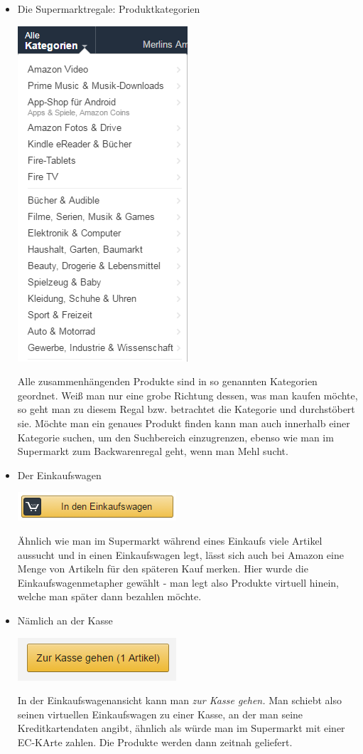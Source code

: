 \documentclass[a4paper,10pt]{article}
\begin{document}
\begin{itemize}
\item Die Supermarktregale: Produktkategorien

\includegraphics[scale=1]{kategorien.png}

Alle zusammenhängenden Produkte sind in so genannten Kategorien geordnet. Weiß man nur eine grobe Richtung dessen, was man kaufen möchte, so geht man zu diesem Regal bzw. betrachtet die Kategorie und durchstöbert sie. Möchte man ein genaues Produkt finden kann man auch innerhalb einer Kategorie suchen, um den Suchbereich einzugrenzen, ebenso wie man im Supermarkt zum Backwarenregal geht, wenn man Mehl sucht.

\item Der Einkaufswagen

\includegraphics[scale=1]{wagen.png}

Ähnlich wie man im Supermarkt während eines Einkaufs viele Artikel aussucht und in einen Einkaufswagen legt, lässt sich auch bei Amazon eine Menge von Artikeln für den späteren Kauf merken. Hier wurde die Einkaufswagenmetapher gewählt - man legt also Produkte virtuell hinein, welche man später dann bezahlen möchte.

\item Nämlich an der Kasse

\includegraphics[scale=1]{kasse.png}

In der Einkaufswagenansicht kann man \textit{zur Kasse gehen.} Man schiebt also seinen virtuellen Einkaufswagen zu einer Kasse, an der man seine Kreditkartendaten angibt, ähnlich als würde man im Supermarkt mit einer EC-KArte zahlen. Die Produkte werden dann zeitnah geliefert.
\end{itemize}
\end{document}
